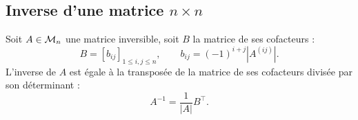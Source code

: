 \subsection{Inverse d'une matrice $n \times n$}

\begin{proposition} \label{prop:inverseMatriceCofacteurs}
  Soit $A \in \mathcal{M}_n$ une matrice inversible, soit $B$ la matrice de ses cofacteurs : 
  $$
  B = [b_{ij}]_{1 \leq i, j \leq n}, \qquad 
  b_{ij} = (-1)^{i+j} |A^{(ij)}|.
  $$
  L'inverse de $A$ est égale à la transposée de la matrice de ses cofacteurs divisée par son déterminant : 
  $$
  A^{-1} = \frac1{|A|} B^\top.
  $$
\end{proposition}


